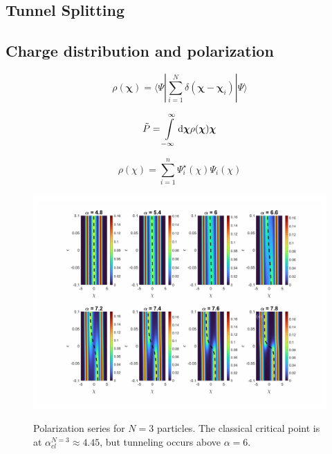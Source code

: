\documentclass[prb,twocolumn,showpacs,preprintnumbers,amsmath,amssymb, superscriptaddress]{revtex4-2}
\newcommand{\n}{N}
\newcommand{\bra}[1]{\langle #1|}
\newcommand{\ket}[1]{|#1\rangle}
\newcommand{\1}{{1\hspace*{-0.5ex} \textrm{l} \hspace*{0.5ex}}}
\begin{document}
\subsection{Tunnel Splitting}

\subsection{Charge distribution and polarization}

\begin{equation}
\rho(\mathbold{\chi}) = \bra{\Psi} \sum_{i=1}^\n \delta(\mathbold{\chi} - \mathbold{\chi}_i)\ket{\Psi}
\end{equation}

\begin{equation}
\tilde{P} = \int\limits_{-\infty}^{\infty} {\rm{d}}\mathbold{\chi} \rho(\mathbold{\chi}) \mathbold{\chi}
\end{equation}

\begin{equation}
\rho(\chi) = \sum_{i=1}^n \Psi^\star_i (\chi) \Psi_i(\chi)
\end{equation}

\begin{figure}[h!]
    \begin{center}
     \includegraphics[width=2\columnwidth]{SupMatFig_DensitySeries}
     \label{fig:experimental_setup}
     \caption{Polarization series for $N = 3$ particles. The classical critical point is at $\alpha_{cl}^{N=3} \approx 4.45$, but tunneling occurs above $\alpha = 6$.}
     
    \end{center}
     \end{figure}
\end{document}
